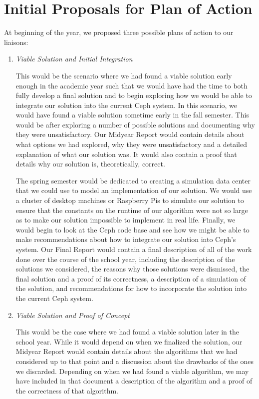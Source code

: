 \chapter{Initial Proposals for Plan of Action}
\label{sec:plan}

At beginning of the year, we proposed three possible plans of action
to our liaisons:

\begin{enumerate}

\item \emph{Viable Solution and Initial Integration}

  This would be the scenario where we had found a viable solution
  early enough in the academic year such that we would have had the
  time to both fully develop a final solution and to begin exploring
  how we would be able to integrate our solution into the current Ceph
  system. In this scenario, we would have found a viable solution
  sometime early in the fall semester. This would be after exploring a
  number of possible solutions and documenting why they were
  unsatisfactory. Our Midyear Report would contain details about what
  options we had explored, why they were unsatisfactory and a detailed
  explanation of what our solution was. It would also contain a proof
  that details why our solution is, theoretically, correct.

  The spring semester would be dedicated to creating a simulation data
  center that we could use to model an implementation of our
  solution. We would use a cluster of desktop machines or Raspberry
  Pis to simulate our solution to ensure that the constants on the
  runtime of our algorithm were not so large as to make our solution
  impossible to implement in real life. Finally, we would begin to
  look at the Ceph code base and see how we might be able to make
  recommendations about how to integrate our solution into Ceph's
  system. Our Final Report would contain a final description of all of
  the work done over the course of the school year, including the
  description of the solutions we considered, the reasons why those
  solutions were dismissed, the final solution and a proof of its
  correctness, a description of a simulation of the solution, and
  recommendations for how to incorporate the solution into the current
  Ceph system.


\item \emph{Viable Solution and Proof of Concept}

  This would be the case where we had found a viable solution later in
  the school year. While it would depend on when we finalized the
  solution, our Midyear Report would contain details about the
  algorithms that we had considered up to that point and a discussion
  about the drawbacks of the ones we discarded. Depending on when we
  had found a viable algorithm, we may have included in that document
  a description of the algorithm and a proof of the correctness of
  that algorithm.


\end{enumerate}
